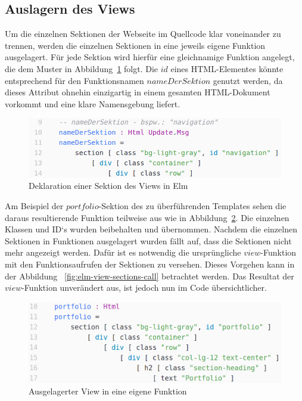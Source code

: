 \subsection{Auslagern des Views}
\label{sec:auslagern-des-views}
Um die einzelnen Sektionen der Webseite im Quellcode klar voneinander zu trennen, werden die einzelnen Sektionen in eine jeweils eigene Funktion ausgelagert.
Für jede Sektion wird hierfür eine gleichnamige Funktion angelegt, die dem Muster in Abbildung~\ref{fig:elm-view-section} folgt. Die $id$ eines \ac{HTML}-Elementes könnte entsprechend für den Funktionsnamen $nameDerSektion$ genutzt werden, da dieses Attribut ohnehin einzigartig in einem gesamten \ac{HTML}-Dokument vorkommt und eine klare Namensgebung liefert.
\begin{figure}[htb]
\centering
\includegraphics[scale=0.53]{img/elm-html-sections.png}
\caption{Deklaration einer Sektion des Views in Elm}\label{fig:elm-view-section}
\end{figure}
Am Beispiel der $portfolio$-Sektion des zu überführenden Templates sehen die daraus resultierende Funktion teilweise aus wie in Abbildung~\ref{fig:elm-view-section-function}. Die einzelnen Klassen und ID`s wurden beibehalten und übernommen. Nachdem die einzelnen Sektionen in Funktionen ausgelagert wurden fällt auf, dass die Sektionen nicht mehr angezeigt werden. Dafür ist es notwendig die ursprüngliche $view$-Funktion mit den Funktionsaufrufen der Sektionen zu versehen. Dieses Vorgehen kann in der Abbildung ~\ref{fig:elm-view-sections-call} betrachtet werden. Das Resultat der $view$-Funktion unverändert aus, ist jedoch nun im Code übersichtlicher.
\begin{figure}[h]
\centering
\includegraphics[scale=0.41]{img/elm-view-portfolio-section-function.png}
\caption{Ausgelagerter View in eine eigene Funktion}\label{fig:elm-view-section-function}
\end{figure}

